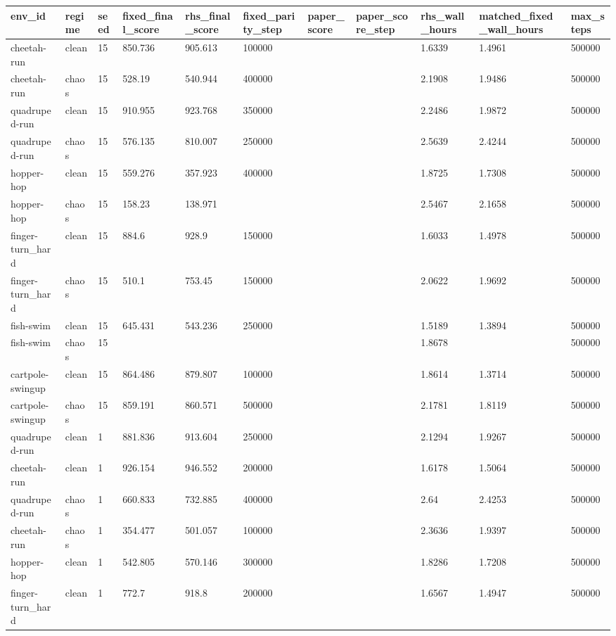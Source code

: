 \begin{tabular}{lllllllllll}
\toprule
env\_id & regime & seed & fixed\_final\_score & rhs\_final\_score & fixed\_parity\_step & paper\_score & paper\_score\_step & rhs\_wall\_hours & matched\_fixed\_wall\_hours & max\_steps \\
\midrule
cheetah-run & clean & 15 & 850.736 & 905.613 & 100000 &  &  & 1.6339 & 1.4961 & 500000 \\
cheetah-run & chaos & 15 & 528.19 & 540.944 & 400000 &  &  & 2.1908 & 1.9486 & 500000 \\
quadruped-run & clean & 15 & 910.955 & 923.768 & 350000 &  &  & 2.2486 & 1.9872 & 500000 \\
quadruped-run & chaos & 15 & 576.135 & 810.007 & 250000 &  &  & 2.5639 & 2.4244 & 500000 \\
hopper-hop & clean & 15 & 559.276 & 357.923 & 400000 &  &  & 1.8725 & 1.7308 & 500000 \\
hopper-hop & chaos & 15 & 158.23 & 138.971 &  &  &  & 2.5467 & 2.1658 & 500000 \\
finger-turn\_hard & clean & 15 & 884.6 & 928.9 & 150000 &  &  & 1.6033 & 1.4978 & 500000 \\
finger-turn\_hard & chaos & 15 & 510.1 & 753.45 & 150000 &  &  & 2.0622 & 1.9692 & 500000 \\
fish-swim & clean & 15 & 645.431 & 543.236 & 250000 &  &  & 1.5189 & 1.3894 & 500000 \\
fish-swim & chaos & 15 &  &  &  &  &  & 1.8678 &  & 500000 \\
cartpole-swingup & clean & 15 & 864.486 & 879.807 & 100000 &  &  & 1.8614 & 1.3714 & 500000 \\
cartpole-swingup & chaos & 15 & 859.191 & 860.571 & 500000 &  &  & 2.1781 & 1.8119 & 500000 \\
quadruped-run & clean & 1 & 881.836 & 913.604 & 250000 &  &  & 2.1294 & 1.9267 & 500000 \\
cheetah-run & clean & 1 & 926.154 & 946.552 & 200000 &  &  & 1.6178 & 1.5064 & 500000 \\
quadruped-run & chaos & 1 & 660.833 & 732.885 & 400000 &  &  & 2.64 & 2.4253 & 500000 \\
cheetah-run & chaos & 1 & 354.477 & 501.057 & 100000 &  &  & 2.3636 & 1.9397 & 500000 \\
hopper-hop & clean & 1 & 542.805 & 570.146 & 300000 &  &  & 1.8286 & 1.7208 & 500000 \\
finger-turn\_hard & clean & 1 & 772.7 & 918.8 & 200000 &  &  & 1.6567 & 1.4947 & 500000 \\

\end{tabular}
